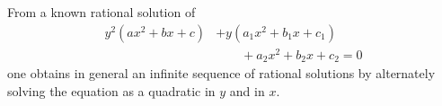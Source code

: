 \begin{proposition}
    From a known rational solution of
\[
    \begin{aligned}y^2(ax^2+bx+c)&+y(a_1x^2+b_1x+c_1)\\&\qquad+a_2x^2+b_2x+c_2=0\end{aligned}
\]
    one obtains in general an infinite sequence of rational solutions by alternately solving the equation as a quadratic in $y$ and in $x$.
\end{proposition}
